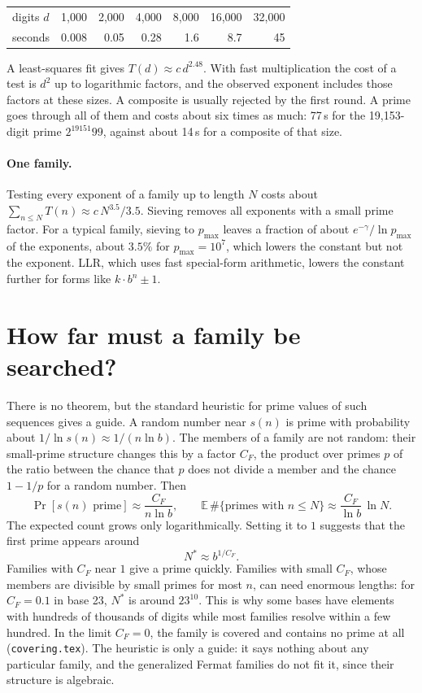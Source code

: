 \documentclass[11pt]{article}
\theoremstyle{remark}
\newcommand{\code}[1]{\texttt{#1}}
\begin{document}
\begin{center}
\begin{tabular}{@{}lrrrrrr@{}}
\toprule
digits $d$ & 1{,}000 & 2{,}000 & 4{,}000 & 8{,}000 & 16{,}000 & 32{,}000\\
seconds & 0.008 & 0.05 & 0.28 & 1.6 & 8.7 & 45\\
\bottomrule
\end{tabular}
\end{center}

A least-squares fit gives $T(d)\approx c\,d^{2.48}$. With fast multiplication the cost of a test is $d^2$ up to logarithmic factors, and the observed exponent includes those factors at these sizes. A composite is usually rejected by the first round. A prime goes through all of them and costs about six times as much: 77\,s for the 19{,}153-digit prime $2^{19151}99$, against about 14\,s for a composite of that size.

\paragraph{One family.} Testing every exponent of a family up to length $N$ costs about $\sum_{n\le N}T(n)\approx c\,N^{3.5}/3.5$. Sieving removes all exponents with a small prime factor. For a typical family, sieving to $p_{\max}$ leaves a fraction of about $e^{-\gamma}/\ln p_{\max}$ of the exponents, about $3.5\%$ for $p_{\max}=10^7$, which lowers the constant but not the exponent. LLR, which uses fast special-form arithmetic, lowers the constant further for forms like $k\cdot b^n\pm1$.

\section{How far must a family be searched?}\label{sec:heuristic}

There is no theorem, but the standard heuristic for prime values of such sequences gives a guide. A random number near $s(n)$ is prime with probability about $1/\ln s(n)\approx 1/(n\ln b)$. The members of a family are not random: their small-prime structure changes this by a factor $C_F$, the product over primes $p$ of the ratio between the chance that $p$ does not divide a member and the chance $1-1/p$ for a random number. Then
\[
  \Pr[s(n)\text{ prime}]\approx\frac{C_F}{n\ln b},\qquad
  \mathbb{E}\,\#\{\text{primes with } n\le N\}\approx\frac{C_F}{\ln b}\,\ln N .
\]
The expected count grows only logarithmically. Setting it to $1$ suggests that the first prime appears around
\[
  N^*\approx b^{1/C_F}.
\]
Families with $C_F$ near $1$ give a prime quickly. Families with small $C_F$, whose members are divisible by small primes for most $n$, can need enormous lengths: for $C_F=0.1$ in base 23, $N^*$ is around $23^{10}$. This is why some bases have elements with hundreds of thousands of digits while most families resolve within a few hundred. In the limit $C_F=0$, the family is covered and contains no prime at all (\code{covering.tex}). The heuristic is only a guide: it says nothing about any particular family, and the generalized Fermat families do not fit it, since their structure is algebraic.
\end{document}
